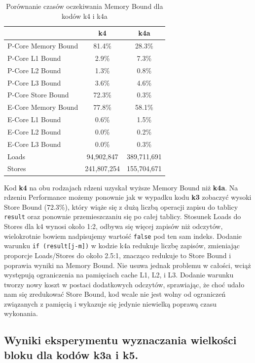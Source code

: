 \documentclass[10pt]{article}
\begin{document}
\begin{table}[h!]
\centering
\begingroup
\begin{tabular}{|l|c|c|}
\hline
 & \textbf{k4} & \textbf{k4a} \\
\hline
P-Core Memory Bound & 81.4\% & 28.3\% \\
\hline
P-Core L1 Bound & 2.9\% & 7.3\% \\
\hline
P-Core L2 Bound & 1.3\% & 0.8\% \\
\hline
P-Core L3 Bound & 3.6\% & 4.6\% \\
\hline
P-Core Store Bound & 72.3\% & 0.3\% \\
\hline
E-Core Memory Bound & 77.8\% & 58.1\% \\
\hline
E-Core L1 Bound & 0.6\% & 1.5\% \\
\hline
E-Core L2 Bound & 0.0\% & 0.2\% \\
\hline
E-Core	 L3 Bound & 0.0\% & 0.3\% \\
\hline
Loads & 94,902,847 & 389,711,691 \\
\hline
Stores & 241,807,254 & 155,704,671 \\
\hline
\end{tabular}
\endgroup
\caption{Porównanie czasów oczekiwania Memory Bound dla kodów k4 i k4a}
\end{table}

Kod \textbf{k4} na obu rodzajach rdzeni uzyskał wyższe Memory Bound niż \textbf{k4a}.
Na rdzeniu Performance możemy ponownie jak w wypadku kodu \textbf{k3} zobaczyć 
wysoki Store Bound (72.3\%), który wiąże się z dużą liczbą operacji zapisu do tablicy 
\texttt{result} oraz ponownie przemieszczaniu się po całej tablicy.
Stosunek Loads do Stores dla k4 wynosi około 1:2, odbywa się więcej zapisów niż odczytów,
wielokrotnie bowiem nadpisujemy wartość \texttt{false} pod ten sam indeks.
Dodanie warunku \texttt{if (result[j-m])} w kodzie k4a redukuje liczbę zapisów, 
zmieniając proporcje Loads/Stores do około 2.5:1, znacząco redukuje to Store Bound i poprawia 
wyniki na Memory Bound. Nie usuwa jednak problemu w całości, wciąż występują ograniczenia na pamięciach cache L1, L2, i L3.
Dodanie warunku tworzy nowy koszt w postaci dodatkowych odczytów, sprawiając, że choć udało nam się zredukować Store Bound,
kod wcale nie jest wolny od ograniczeń związanych z pamięcią i wykazuje się jedynie niewielką poprawą czasu wykonania.

\subsection*{Wyniki eksperymentu wyznaczania wielkości bloku dla kodów k3a i k5.}
\end{document}
